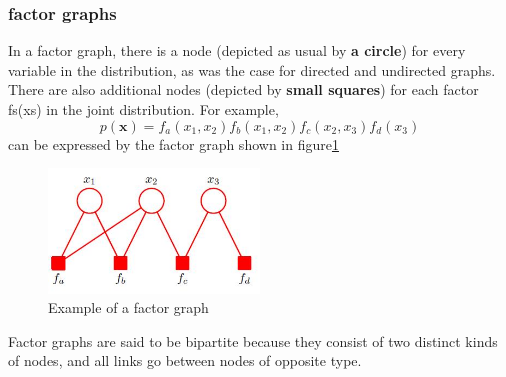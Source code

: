 \documentclass[a4paper]{book}
\renewcommand{\bf}{\mathbf}
\begin{document}
\subsubsection{factor graphs}
In a factor graph, there is a node (depicted as usual by \textbf{a circle}) for every variable
in the distribution, as was the case for directed and undirected graphs. There are also
additional nodes (depicted by \textbf{small squares}) for each factor fs(xs) in the joint distribution.\newline
For example,
\begin{equation}\label{eq8.21}
  p(\bf{x}) = f_a(x_1,x_2)f_b(x_1,x_2)f_c(x_2,x_3)f_d(x_3)
\end{equation}
can be expressed by the factor graph shown in figure\ref{GM5}
\begin{figure}
  \centering
  \includegraphics[width=0.5\textwidth]{./imgs/GM5.jpg}
  \caption{Example of a factor graph}\label{GM5}
\end{figure}
Factor graphs are said to be bipartite because they consist of two distinct kinds
of nodes, and all links go between nodes of opposite type.
\end{document}

